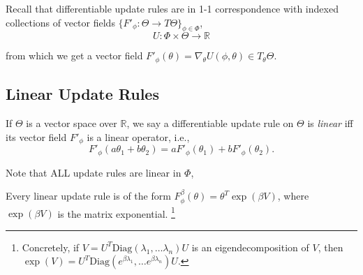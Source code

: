 \documentclass{article}
\begin{document}
Recall that differentiable update rules are in 1-1 correspondence with indexed
collections of vector fields $\{ F'_\phi : \Theta \to T\Theta \}_{\phi \in \Phi}$,
\[
    U : \Phi \times \Theta\to \mathbb R
\]

from which we get a vector field $F'_\phi(\theta) = \nabla_{\theta} U(\phi, \theta) \in T_{\theta} \Theta$.


\subsection{Linear Update Rules}

\begin{defn}\label{ax:linear}
    If $\Theta$ is a vector space over $\mathbb R$, we say
    a differentiable update rule on $\Theta$ is \emph{linear} iff its vector field $F'_\phi$ is a linear operator, i.e.,
    \[ F'_\phi(a \theta_1 + b \theta_2) = a F'_\phi(\theta_1) + b F'_\phi(\theta_2). \]
\end{defn}


Note that ALL update rules are linear in $\Phi$,
\begin{prop}

\end{prop}


\begin{prop}
    Every linear update rule is of the form
    $
        F^{\beta}_\phi(\theta) =  \theta^{T} \exp(\beta V)
    $,
    where $\exp(\beta V)$ is the matrix exponential.%
        \footnote{Concretely, if $V = U^T \mathrm{Diag}(\lambda_1, \ldots \lambda_n) U$ is an eigendecomposition of $V$, then $\exp(V) = U^T \mathrm{Diag}(e^{\beta\lambda_1}, \ldots e^{\beta\lambda_n}) U$.}
\end{prop}
\end{document}
